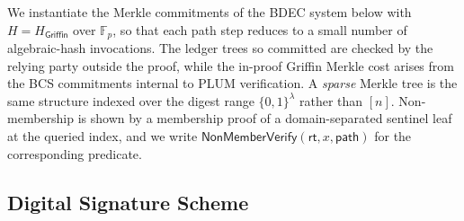 We instantiate the Merkle commitments of the BDEC system below with $H=H_{\mathsf{Griffin}}$ over $\mathbb{F}_p$, so that each path step reduces to a small number of algebraic-hash invocations. The ledger trees so committed are checked by the relying party outside the proof, while the in-proof Griffin Merkle cost arises from the BCS commitments internal to PLUM verification. A \emph{sparse} Merkle tree is the same structure indexed over the digest range $\{0,1\}^{\lambda}$ rather than $[n]$. Non-membership is shown by a membership proof of a domain-separated sentinel leaf at the queried index, and we write $\mathsf{NonMemberVerify}(\mathsf{rt},x,\mathsf{path})$ for the corresponding predicate.

\subsection{Digital Signature Scheme}
